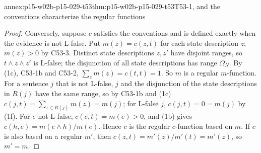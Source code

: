 \begin{annexitem}{annex:p15-w02b-p15-029-t53}{thm:p15-w02b-p15-029-t53}{T53-1, and the conventions characterize the regular functions}
\begin{proof}
Conversely, suppose \(c\) satisfies the conventions and is defined
exactly when the evidence is not L-false. Put \(m(z)=c(z,t)\) for each
state description \(z\); \(m(z)>0\) by C53-3. Distinct state
descriptions \(z,z'\) have disjoint ranges, so \(t\land z\land z'\) is
L-false; the disjunction of all state descriptions has range
\(\Omega_N\). By (1c), C53-1b and C53-2,
\(\sum_zm(z)=c(t,t)=1\). So \(m\) is a regular \(m\)-function. For a
sentence \(j\) that is not L-false, \(j\) and the disjunction of the
state descriptions in \(R(j)\) have the same range, so by C53-1b and
(1c) \(c(j,t)=\sum_{z\in R(j)}m(z)=m(j)\); for L-false \(j\),
\(c(j,t)=0=m(j)\) by (1f). For \(e\) not L-false, \(c(e,t)=m(e)>0\),
and (1b) gives \(c(h,e)=m(e\land h)/m(e)\). Hence \(c\) is the regular
\(c\)-function based on \(m\). If \(c\) is also based on a regular
\(m'\), then \(c(z,t)=m'(z)/m'(t)=m'(z)\), so \(m'=m\).
\end{proof}
\end{annexitem}


